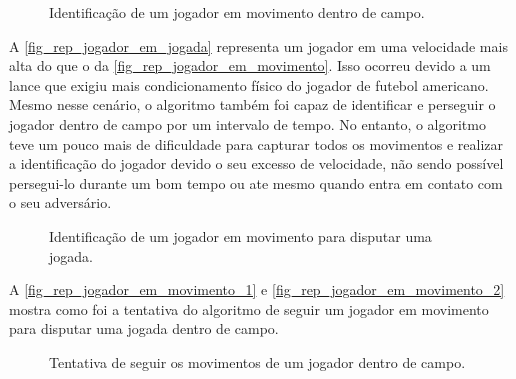 
\begin{figure}[ht]
	\caption{\label{fig_rep_jogador_em_movimento}Identificação de um jogador em movimento dentro de campo.}
	\begin{center}
	\end{center}
	\centering {}
\end{figure}

A \autoref{fig_rep_jogador_em_jogada} representa um jogador em uma velocidade mais alta do que o da \autoref{fig_rep_jogador_em_movimento}. Isso ocorreu devido a um lance que exigiu mais condicionamento físico do jogador de futebol americano. Mesmo nesse cenário, o algoritmo também foi capaz de identificar e perseguir o jogador dentro de campo por um intervalo de tempo. No entanto, o algoritmo teve um pouco mais de dificuldade para capturar todos os movimentos e realizar a identificação do  jogador devido o seu excesso de velocidade, não sendo possível persegui-lo durante um bom tempo ou ate mesmo quando entra em contato com o seu adversário.


\begin{figure}[ht]
	\caption{\label{fig_rep_jogador_em_jogada}Identificação de um jogador em movimento para disputar uma jogada.}
	\begin{center}
	\end{center}
	\centering {}
\end{figure}

A \autoref{fig_rep_jogador_em_movimento_1} e \autoref{fig_rep_jogador_em_movimento_2} mostra como foi a tentativa do algoritmo de seguir um jogador em movimento para disputar uma jogada dentro de campo.

\begin{figure}[ht]
	\caption{\label{fig_rep_jogador_em_movimento_1}Tentativa de seguir os movimentos de um jogador dentro de campo.}
	\begin{center}
	\end{center}
	\centering {}
\end{figure}

